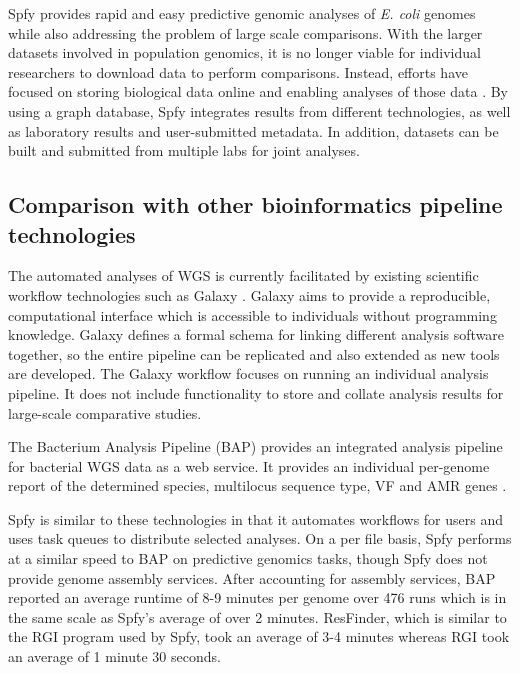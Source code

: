 \documentclass{article}
\begin{document}
Spfy provides rapid and easy predictive genomic analyses of \textit{E. coli} genomes while also addressing the problem of large scale comparisons. With the larger datasets involved in population genomics, it is no longer viable for individual researchers to download data to perform comparisons. Instead, efforts have focused on storing biological data online and enabling analyses of those data \cite{schatz2015biological}. By using a graph database, Spfy integrates results from  different technologies, as well as laboratory results and user-submitted metadata. In addition, datasets can be built and submitted from multiple labs for joint analyses.

\subsection{Comparison with other bioinformatics pipeline technologies}


The automated analyses of WGS is currently facilitated by existing scientific workflow technologies such as Galaxy \cite{goecks2010galaxy}. Galaxy aims to provide a reproducible, computational interface which is accessible to individuals without programming knowledge. Galaxy defines a formal schema for linking different analysis software together, so the entire pipeline can be replicated and also extended as new tools are developed. The Galaxy workflow focuses on running an individual analysis pipeline. It does not include functionality to store and collate analysis results for large-scale comparative studies.

The Bacterium Analysis Pipeline (BAP) \cite{thomsen2016bacterial} provides an integrated analysis pipeline for bacterial WGS data as a web service. It provides an individual per-genome report of the determined species, multilocus sequence type, VF and AMR genes \cite{thomsen2016bacterial}.

Spfy is similar to these technologies in that it automates workflows for users and uses task queues to distribute selected analyses.
On a per file basis, Spfy performs at a similar speed to BAP on predictive genomics tasks, though Spfy does not provide genome assembly services.
After accounting for assembly services, BAP reported \cite{thomsen2016bacterial} an average runtime of 8-9 minutes per genome over 476 runs which is in the same scale as Spfy's average of over 2 minutes.
ResFinder, which is similar to the RGI program used by Spfy, took an average of 3-4 minutes whereas RGI took an average of 1 minute 30 seconds.
\end{document}
